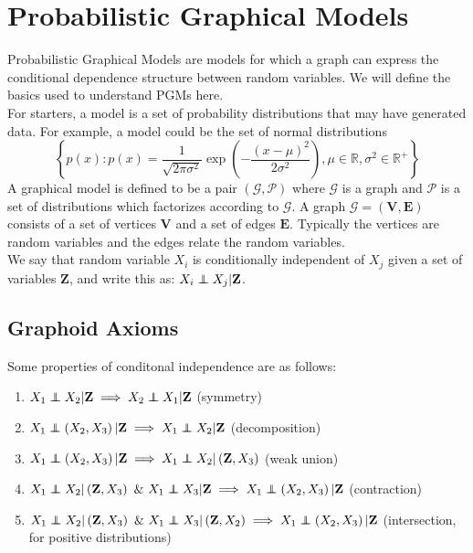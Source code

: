 \section{Probabilistic Graphical Models}
Probabilistic Graphical Models are models for which a graph can express the
conditional dependence structure between random variables. We will define
the basics used to understand PGMs here. \\
For starters, a model is a set of probability distributions that may
have generated data. For example, a model could be the set of normal distributions
\begin{equation}
  \left\{ p(x) : p(x) = \frac{1}{\sqrt{2\pi \sigma^2}} \exp \left( -\frac{(x-\mu)^2}{2\sigma^2} \right), \mu \in \mathbb{R}, \sigma^2 \in \mathbb{R}^+\right\}
\end{equation}
A graphical model is defined to be a pair $(\mathcal{G}, \mathcal{P})$ where
$\mathcal{G}$ is a graph and $\mathcal{P}$ is a set of distributions which
factorizes according to $\mathcal{G}$. A graph $\mathcal{G} = (\mathbf{V}, \mathbf{E})$
consists of a set of vertices $\mathbf{V}$ and a set of edges $\mathbf{E}$.
Typically the vertices are random variables and the edges relate the random variables.\\
We say that random variable $X_i$ is conditionally independent of $X_j$ given a set of
variables $\mathbf{Z}$, and write this as: $X_i \indep X_j | \mathbf{Z}$.\\
\subsection{Graphoid Axioms}
Some properties of conditonal independence are as follows:
\begin{enumerate}
  \item $X_1 \indep X_2 | \mathbf{Z} \implies X_2 \indep X_1|\mathbf{Z}$ (symmetry)
  \item $X_1 \indep \left( X_2, X_3 \right) | \mathbf{Z} \implies X_1 \indep X_2|\mathbf{Z}$ (decomposition)
  \item $X_1 \indep \left( X_2, X_3 \right) | \mathbf{Z} \implies X_1 \indep X_2|\left(\mathbf{Z}, X_3\right)$ (weak union)
  \item $X_1 \indep X_2|\left(\mathbf{Z}, X_3\right) \,\, \& \,\, X_1 \indep X_3 | \mathbf{Z} \implies X_1 \indep \left(X_2, X_3 \right) | \mathbf{Z}$ (contraction)
  \item $X_1 \indep X_2 | \left(\mathbf{Z}, X_3\right) \,\, \& \,\, X_1 \indep X_3 | \left(\mathbf{Z}, X_2\right) \implies X_1 \indep \left(X_2, X_3\right)|\mathbf{Z}$ (intersection, for positive distributions)
\end{enumerate}
